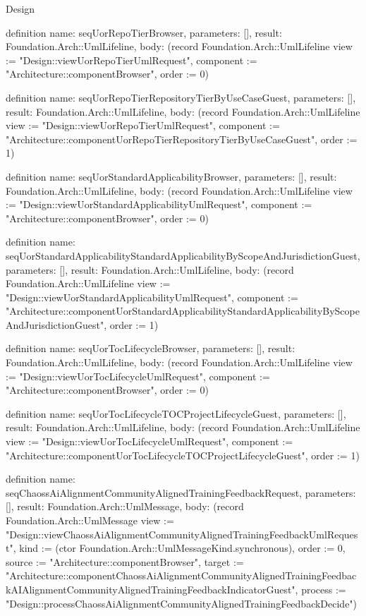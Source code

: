 \begin{lexlean}{Design}
\begin{semanticmodule}
definition{
  name: seqUorRepoTierBrowser,
  parameters: [],
  result: Foundation.Arch::UmlLifeline,
  body: (record Foundation.Arch::UmlLifeline {view := "Design::viewUorRepoTierUmlRequest", component := "Architecture::componentBrowser", order := 0})
}

definition{
  name: seqUorRepoTierRepositoryTierByUseCaseGuest,
  parameters: [],
  result: Foundation.Arch::UmlLifeline,
  body: (record Foundation.Arch::UmlLifeline {view := "Design::viewUorRepoTierUmlRequest", component := "Architecture::componentUorRepoTierRepositoryTierByUseCaseGuest", order := 1})
}

definition{
  name: seqUorStandardApplicabilityBrowser,
  parameters: [],
  result: Foundation.Arch::UmlLifeline,
  body: (record Foundation.Arch::UmlLifeline {view := "Design::viewUorStandardApplicabilityUmlRequest", component := "Architecture::componentBrowser", order := 0})
}

definition{
  name: seqUorStandardApplicabilityStandardApplicabilityByScopeAndJurisdictionGuest,
  parameters: [],
  result: Foundation.Arch::UmlLifeline,
  body: (record Foundation.Arch::UmlLifeline {view := "Design::viewUorStandardApplicabilityUmlRequest", component := "Architecture::componentUorStandardApplicabilityStandardApplicabilityByScopeAndJurisdictionGuest", order := 1})
}

definition{
  name: seqUorTocLifecycleBrowser,
  parameters: [],
  result: Foundation.Arch::UmlLifeline,
  body: (record Foundation.Arch::UmlLifeline {view := "Design::viewUorTocLifecycleUmlRequest", component := "Architecture::componentBrowser", order := 0})
}

definition{
  name: seqUorTocLifecycleTOCProjectLifecycleGuest,
  parameters: [],
  result: Foundation.Arch::UmlLifeline,
  body: (record Foundation.Arch::UmlLifeline {view := "Design::viewUorTocLifecycleUmlRequest", component := "Architecture::componentUorTocLifecycleTOCProjectLifecycleGuest", order := 1})
}

definition{
  name: seqChaossAiAlignmentCommunityAlignedTrainingFeedbackRequest,
  parameters: [],
  result: Foundation.Arch::UmlMessage,
  body: (record Foundation.Arch::UmlMessage {view := "Design::viewChaossAiAlignmentCommunityAlignedTrainingFeedbackUmlRequest", kind := (ctor Foundation.Arch::UmlMessageKind.synchronous), order := 0, source := "Architecture::componentBrowser", target := "Architecture::componentChaossAiAlignmentCommunityAlignedTrainingFeedbackAIAlignmentCommunityAlignedTrainingFeedbackIndicatorGuest", process := "Design::processChaossAiAlignmentCommunityAlignedTrainingFeedbackDecide"})
}


\end{semanticmodule}
\end{lexlean}
